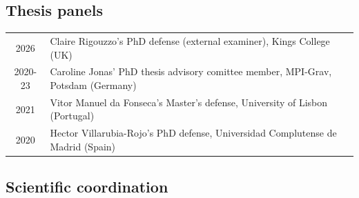 \documentclass[11pt,a4paper]{article}
\newcommand{\mzc}[1]{}
\begin{document}
\subsection*{Thesis panels}

\vspace{-.3cm}
\begin{longtable}{c p{15.5cm}}
2026 & Claire Rigouzzo's PhD defense (external examiner), Kings College (UK) \\
2020-23 & Caroline Jonas' PhD thesis advisory comittee member, MPI-Grav, Potsdam (Germany) \\
2021 & {Vitor Manuel da Fonseca}'s Master's defense, University of Lisbon (Portugal) %
\\
 2020  & {Hector Villarubia-Rojo}'s PhD defense, Universidad Complutense de Madrid (Spain) %
\end{longtable}
\mzc{Update!}


\subsection*{Scientific coordination}
\end{document}
